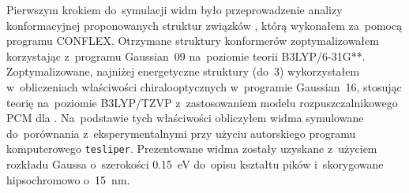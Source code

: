 Pierwszym krokiem do~symulacji widm było przeprowadzenie analizy konformacyjnej
  proponowanych struktur związków , którą wykonałem
  za~pomocą programu CONFLEX.
Otrzymane struktury konformerów zoptymalizowałem korzystając z~programu
  Gaussian~09 na~poziomie teorii B3LYP/6-31G**.
Zoptymalizowane, najniżej energetyczne struktury (do~\SI{3}{\kcalpm}) wykorzystałem w~obliczeniach
  właściwości chiralooptycznych w~programie Gaussian~16, stosując teorię
  na~poziomie B3LYP/TZVP z~zastosowaniem modelu rozpuszczalnikowego PCM dla .
Na~podstawie tych właściwości obliczyłem widma symulowane do~porównania z~eksperymentalnymi
  przy użyciu autorskiego programu komputerowego \texttt{tesliper}.
Prezentowane widma zostały uzyskane z~użyciem rozkładu Gaussa o~szerokości \SI{0.15}{\electronvolt}
  do~opisu kształtu pików i~skorygowane hipsochromowo o~\SI{15}{\nano\meter}.
